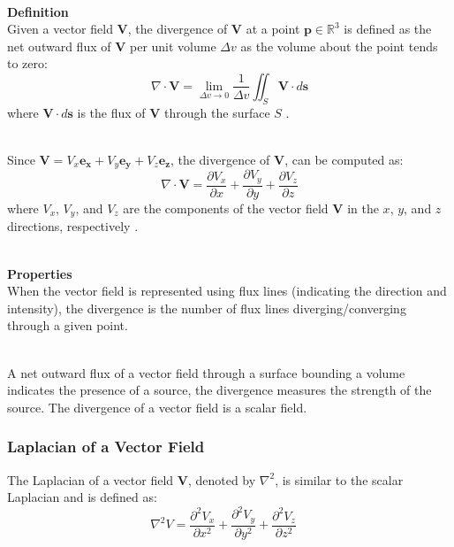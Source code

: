 \documentclass[main]{subfiles}
\begin{document}
\noindent\\
\textbf{Definition}\noindent\\
Given a vector field \(\mathbf{V}\), the divergence of \(\mathbf{V}\) at a point 
\( \mathbf{p} \in \mathbb{R}^3 \) is defined as the net outward flux of 
\(\mathbf{V}\) per unit volume \(\Delta v\) as the volume about the point tends 
to zero:
\begin{equation}
\nabla \cdot \mathbf{V} = \lim_{\Delta v \to 0} \frac{1}{\Delta v} \iint_S 
\mathbf{V} \cdot d\mathbf{s}
\label{eq:divergence}
\end{equation}
where \( \mathbf{V} \cdot d\mathbf{s} \) is the flux of \( \mathbf{V} \) through 
the surface \(S\) \cite{book-magnetism}.

\noindent\\
Since \(\mathbf{V} = V_{x} \mathbf{e_x} + V_{y} \mathbf{e_y} + V_{z} 
\mathbf{e_z}\), the divergence of \(\mathbf{V}\), can be computed as:
\begin{equation}
\nabla \cdot \mathbf{V} = \frac{\partial V_{x}}{\partial x} + \frac{\partial 
V_{y}}{\partial y} + \frac{\partial V_{z}}{\partial z}
\end{equation}
where \(V_{x}\), \(V_{y}\), and \(V_{z}\) are the components of the vector field 
\(\mathbf{V}\) in the \(x\), \(y\), and \(z\) directions, respectively 
\cite{math-book}.

\noindent\\
\textbf{Properties}\noindent\\
When the vector field is represented using flux lines (indicating the direction 
and intensity), the divergence is the number of flux lines diverging/converging 
through a given point.

\noindent\\
A net outward flux of a vector field through a surface bounding a volume 
indicates the presence of a source, the divergence measures the strength of the 
source. The divergence of a vector field is a scalar field. 

\subsubsection{Laplacian of a Vector Field}
The Laplacian of a vector field $\mathbf{V}$, denoted by $\nabla^2$, is similar 
to the scalar Laplacian and is defined as:
\begin{equation}
\nabla^2 V = \frac{\partial^2 V_x}{\partial x^2} + \frac{\partial^2 V_y}{\partial 
y^2} + \frac{\partial^2 V_z}{\partial z^2} \quad
\end{equation}
\end{document}
